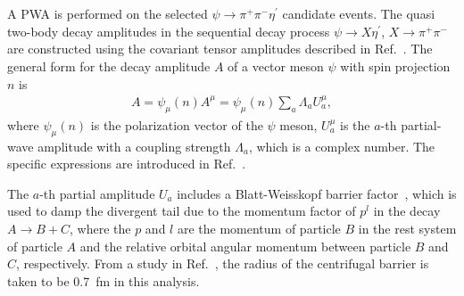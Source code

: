 \documentclass[twocolumn,showpacs,aps,prd]{revtex4-1}
\begin{document}
\section{}\label{pwamethod}
\subsection{}
\label{sectionpwa}

A PWA is performed on the selected $\psi \to \pi^+\pi^-\eta^\prime$ candidate events. The quasi two-body decay
amplitudes in the sequential decay process $\psi \to X\eta^\prime$, $X\to \pi^+\pi^-$ are constructed using the
covariant tensor amplitudes described in Ref.~\cite{zoubs}. The general form for the decay amplitude $A$ of a vector meson $\psi$ with spin projection $n$ is
%
\begin{eqnarray}
  \label{Amp}
  A = \psi_\mu(n) A^\mu = \psi_\mu(n)\sum_a \Lambda_a U_a^\mu,
\end{eqnarray}
%
where $\psi_\mu(n)$ is the polarization vector of the $\psi$ meson, $U_a^\mu$ is the $a$-th partial-wave amplitude with a coupling
strength $\Lambda_a$, which is a complex number. The specific expressions are introduced in Ref.~\cite{zoubs}.

The $a$-th partial amplitude $U_a$ includes a Blatt-Weisskopf barrier factor~\cite{zoubs}, which is used
to damp the divergent tail due to the momentum factor of $p^l$ in the decay $A\to B + C$, where the $p$ and $l$ are the momentum of particle
$B$ in the rest system of particle $A$ and the relative orbital angular momentum between particle $B$ and $C$, respectively. From
a study in Ref.~\cite{barrier}, the radius of the centrifugal barrier is taken to be 0.7~fm in this analysis.
\end{document}
